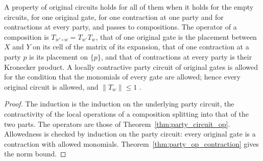 \begin{theorem}
    \label{thm:party_original_op}
    \leanok
    A property of original circuits holds for all of them when it holds for the empty
    circuits, for one original gate, for one contraction at one party and for
    contractions at every party, and passes to compositions. The operator of a
    composition is $T_{w'\circ w}=T_{w'}T_w$, that of one original gate is the
    placement between $X$ and $Y$ on its cell of the matrix of its expansion, that of
    one contraction at a party $p$ is its placement on $\{p\}$, and that of
    contractions at every party is their Kronecker product. A locally contractive
    party circuit of original gates is allowed for the condition that the monomials of
    every gate are allowed; hence every original circuit is allowed, and
    $\lVert T_w\rVert\le1$ \cite[Section~5.1]{OpenAI2026PolynomialPEPS}.
\end{theorem}
\begin{proof}\leanok
    The induction is the induction on the underlying party circuit, the contractivity
    of the local operations of a composition splitting into that of the two parts. The
    operators are those of Theorem~\ref{thm:party_circuit_op}. Allowedness is checked
    by induction on the party circuit: every original gate is a contraction with
    allowed monomials. Theorem~\ref{thm:party_op_contraction} gives the norm bound.
\end{proof}

